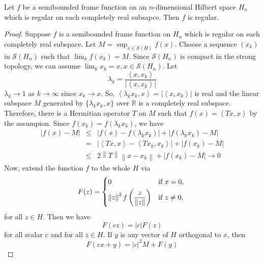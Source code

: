  \begin{lemma}
    \label{regularity lemma}
    Let \(f\) be a semibounded frame function on an \(n\)-dimensional Hilbert space \(H_n\) which is regular on each completely real subsapce. Then \(f\) is regular.
    \begin{proof}
        Suppose \(f\) is a semibounded frame function on \(H_n\) which is regular on each completely real subspace. Let \(M=\sup_{x \in \mathcal{S}(H)} f(x)\). Choose a sequence \((x_k)\) in \(\mathcal{S}(H_n)\) such that \(\lim_{k} f(x_k) = M\). Since \(\mathcal{S}(H_n)\) is compact in the strong topology, we can assume \(\lim_k x_k = x, x\in \mathcal{S}(H_n)\). Let \[\lambda_k=\frac{\left \langle x,x_k \right \rangle}{\left \lvert \left \langle x,x_k \right \rangle \right \rvert}\]
        \(\lambda_k \to 1\) as \(k \to \infty \) since \(x_k \to x\). So, \(\left \langle \lambda_k x_k,x \right \rangle=\left \lvert \left \langle x,x_k \right \rangle \right \rvert\) is real and the linear subspace \(M\) generated by \(\{\lambda_k x_k, x\}\) over \(\mathbb{R}\) is a completely real subspace. Therefore, there is a Hermitian operator \(T\) on \(M\) such that \(f(x)=\left \langle Tx,x \right \rangle\) by the assumpion. Since \(f(x_k)=f(\lambda_k x_k)\), we have
        \begin{eqnarray*}
            \left \lvert f(x) - M \right \rvert &\le&
            \left \lvert f(x) - f(\lambda_k x_k) \right \rvert + \left \lvert f(\lambda_k x_k) - M \right \rvert \\
            &=& \left \lvert \left \langle Tx,x \right \rangle - \left \langle Tx_k,x_k \right \rangle\right \rvert + \left \lvert f(x_k) - M \right \rvert \\
            &\le& 2 \left \lVert T \right \rVert \left \lVert x-x_k \right \rVert + \left \lvert f(x_k) - M \right \rvert \to 0
        \end{eqnarray*}
        Now, extend the function \(f\) to the whole \(H\) via
        \[F(z)=\begin{dcases*}
            0 & if \(x=0\),\\
            \left \lVert z \right \rVert^2 f\left(\frac{z}{\left \lVert z \right \rVert}\right) & if \(z \neq 0\),
        \end{dcases*} \]
        for all \(z \in H\). Then we have
        \[F(cz)=\left \lvert c \right \rvert F(z)\]
        for all scalar \(c\) and for all \(z \in H\).
        If \(y\) is any vector of \(H\) orthogonal to \(x\), then
        \[F(cx+y)=\left \lvert c \right \rvert^2 M + F(y)\]

\end{proof}
\end{lemma}

